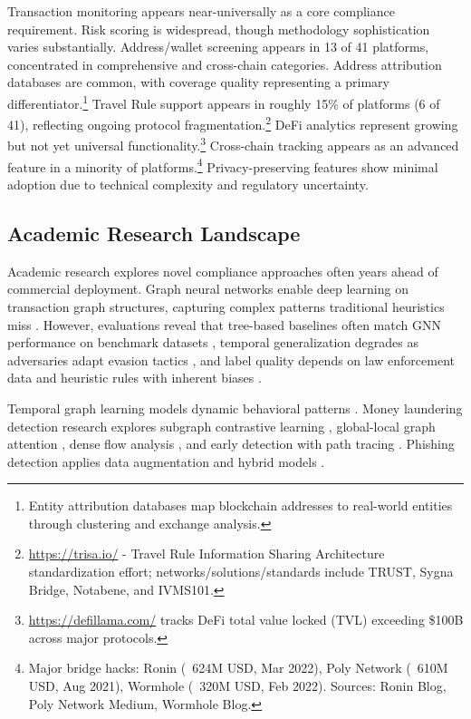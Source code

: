 Transaction monitoring appears near-universally as a core compliance requirement. Risk scoring is widespread, though methodology sophistication varies substantially. Address/wallet screening appears in 13 of 41 platforms, concentrated in comprehensive and cross-chain categories. Address attribution databases are common, with coverage quality representing a primary differentiator.\footnote{Entity attribution databases map blockchain addresses to real-world entities through clustering and exchange analysis.} Travel Rule support appears in roughly 15\% of platforms (6 of 41), reflecting ongoing protocol fragmentation.\footnote{\url{https://trisa.io/} - Travel Rule Information Sharing Architecture standardization effort; networks/solutions/standards include TRUST, Sygna Bridge, Notabene, and IVMS101.} DeFi analytics represent growing but not yet universal functionality.\footnote{\url{https://defillama.com/} tracks DeFi total value locked (TVL) exceeding \$100B across major protocols.} Cross-chain tracking appears as an advanced feature in a minority of platforms.\footnote{Major bridge hacks: Ronin (~624M USD, Mar 2022), Poly Network (~610M USD, Aug 2021), Wormhole (~320M USD, Feb 2022). Sources: Ronin Blog, Poly Network Medium, Wormhole Blog.} Privacy-preserving features show minimal adoption due to technical complexity and regulatory uncertainty.

\subsection{Academic Research Landscape}

Academic research explores novel compliance approaches often years ahead of commercial deployment. Graph neural networks enable deep learning on transaction graph structures, capturing complex patterns traditional heuristics miss \cite{weber2019antimoneylaunderingbitcoin,azad2025machinelearningblockchain,ancelotti2024reviewblockchainapplication,damico2025blockchainnetworkanalysis}. However, evaluations reveal that tree-based baselines often match GNN performance on benchmark datasets \cite{alarab2020comparativeanalysisusing,pourhabibi2020frauddetectionsystematic}, temporal generalization degrades as adversaries adapt evasion tactics \cite{monamo2016unsupervisedlearningrobust}, and label quality depends on law enforcement data and heuristic rules with inherent biases \cite{weber2019antimoneylaunderingbitcoin}.

Temporal graph learning models dynamic behavioral patterns \cite{arnold2024insightscaveatsmining,luo2025optimizingblockchainanalysis}. Money laundering detection research explores subgraph contrastive learning \cite{ouyang2024bitcoinmoneylaundering}, global-local graph attention \cite{li2025globallocalgraphattention}, dense flow analysis \cite{lin2024denseflowspottingcryptocurrency}, and early detection with path tracing \cite{cheng2023evolvepathtracer,cheng2024earlydetectionmalicious}. Phishing detection applies data augmentation and hybrid models \cite{chen2020phishingscamdetection,chen2024ethereumphishingscam,liu2024detectionethereumphishing}.

